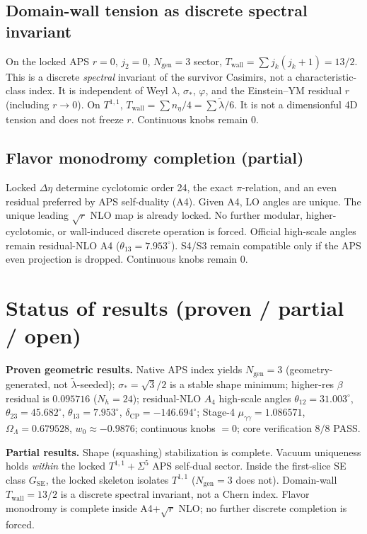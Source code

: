 \documentclass{article}
\begin{document}
\subsection{Domain-wall tension as discrete spectral invariant}
On the locked APS $r=0$, $j_2=0$, $N_{\mathrm{gen}}=3$ sector,
$T_{\mathrm{wall}}=\sum j_k(j_k+1)=13/2$. This is a discrete
\emph{spectral} invariant of the survivor Casimirs, not a
characteristic-class index. It is independent of Weyl $\lambda$,
$\sigma_*$, $\varphi$, and the Einstein--YM residual $r$ (including
$r\to 0$). On $T^{1,1}$, $T_{\mathrm{wall}}=\sum n_\eta/4=\sum\tilde\lambda/6$.
It is not a dimensionful 4D tension and does not freeze $r$.
Continuous knobs remain 0.

\subsection{Flavor monodromy completion (partial)}
Locked $\Delta\eta$ determine cyclotomic order 24, the exact $\pi$-relation,
and an even residual preferred by APS self-duality (A4). Given A4, LO
angles are unique. The unique leading $\sqrt r$ NLO map is already locked.
No further modular, higher-cyclotomic, or wall-induced discrete operation
is forced. Official high-scale angles remain residual-NLO A4
($\theta_{13}=7.953^\circ$). S4/S3 remain compatible only if the APS
even projection is dropped. Continuous knobs remain 0.

\section{Status of results (proven / partial / open)}
\textbf{Proven geometric results.}
Native APS index yields $N_{\mathrm{gen}}=3$ (geometry-generated, not $\tilde\lambda$-seeded);
$\sigma_*=\sqrt{3}/2$ is a stable shape minimum; higher-res $\beta$ residual is
$0.095716$ ($N_h=24$); residual-NLO $A_4$ high-scale angles
$\theta_{12}=31.003^\circ$, $\theta_{23}=45.682^\circ$, $\theta_{13}=7.953^\circ$,
$\delta_{\mathrm{CP}}=-146.694^\circ$; Stage-4 $\mu_{\gamma\gamma}=1.086571$,
$\Omega_\Lambda=0.679528$, $w_0\approx -0.9876$; continuous knobs $=0$; core verification $8/8$ PASS.

\textbf{Partial results.}
Shape (squashing) stabilization is complete. Vacuum uniqueness holds \emph{within}
the locked $T^{1,1}+\Sigma^5$ APS self-dual sector. Inside the first-slice
SE class $G_{\mathrm{SE}}$, the locked skeleton isolates $T^{1,1}$
($N_{\mathrm{gen}}=3$ does not). Domain-wall $T_{\mathrm{wall}}=13/2$
is a discrete spectral invariant, not a Chern index.
Flavor monodromy is complete inside A4+$\sqrt r$ NLO; no further discrete
completion is forced.
\end{document}
